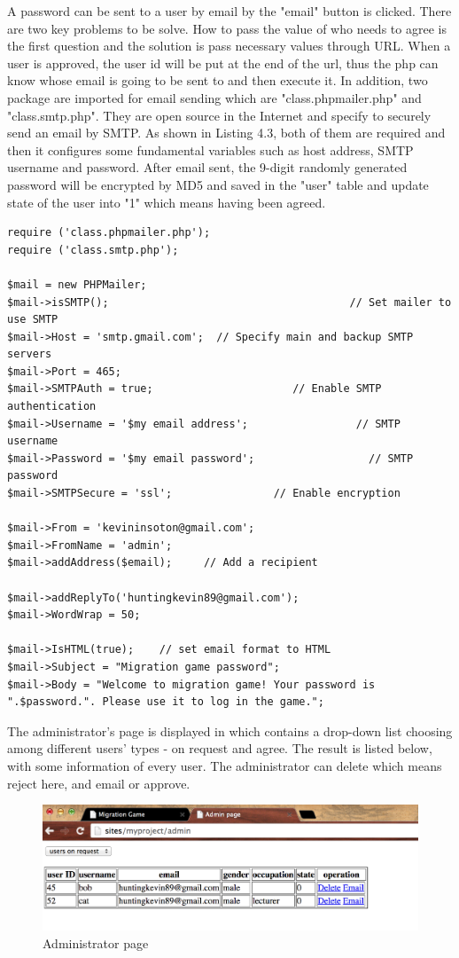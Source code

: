 A password can be sent to a user by email by the "email" button is clicked. There are two key problems to be solve. How to pass the value of who needs to agree is the first question and the solution is pass necessary values through URL. When a user is approved, the user id will be put at the end of the url, thus the php can know whose email is going to be sent to and then execute it. In addition, two package are imported for email sending which are "class.phpmailer.php" and "class.smtp.php". They are open source in the Internet and specify to securely send an email by SMTP. As shown in Listing 4.3, both of them are required and then it configures some fundamental variables such as host address, SMTP username and password. After email sent, the 9-digit randomly generated password will be encrypted by MD5 and saved in the "user" table and update state of the user into "1" which means having been agreed.
\begin{lstlisting}[caption=Email segment]
require ('class.phpmailer.php');
require ('class.smtp.php');

$mail = new PHPMailer;
$mail->isSMTP();                                      // Set mailer to use SMTP
$mail->Host = 'smtp.gmail.com';  // Specify main and backup SMTP servers
$mail->Port = 465;
$mail->SMTPAuth = true;                      // Enable SMTP authentication
$mail->Username = '$my email address';                 // SMTP username
$mail->Password = '$my email password';                  // SMTP password
$mail->SMTPSecure = 'ssl';                // Enable encryption

$mail->From = 'kevininsoton@gmail.com';
$mail->FromName = 'admin';
$mail->addAddress($email);     // Add a recipient

$mail->addReplyTo('huntingkevin89@gmail.com');
$mail->WordWrap = 50;

$mail->IsHTML(true);    // set email format to HTML
$mail->Subject = "Migration game password";
$mail->Body = "Welcome to migration game! Your password is ".$password.". Please use it to log in the game.";

\end{lstlisting}

The administrator's page is displayed in  which contains a drop-down list choosing among different users' types - on request and agree. The result is listed below, with some information of every user. The administrator can delete which means reject here, and email or approve.
\begin{figure}[!htb]
  \centering
  \includegraphics[width=14cm]{admin.png}
  \caption{Administrator page}
  \label{Figure:admin}
\end{figure}

